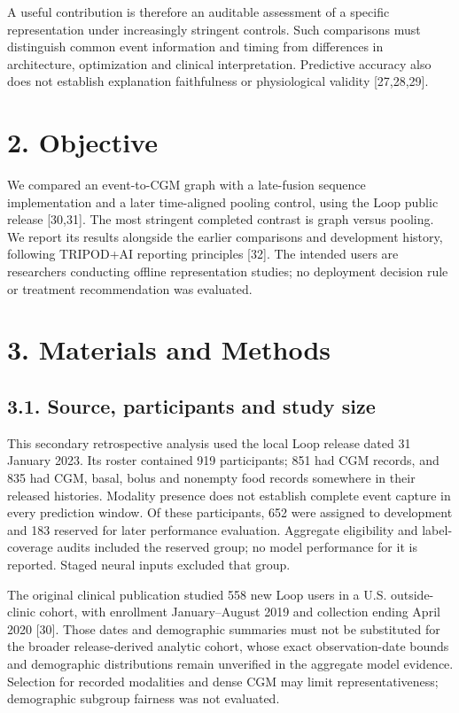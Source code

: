\documentclass[11pt,a4paper]{article}
\begin{document}
A useful contribution is therefore an auditable assessment of a specific representation under increasingly stringent controls. Such comparisons must distinguish common event information and timing from differences in architecture, optimization and clinical interpretation. Predictive accuracy also does not establish explanation faithfulness or physiological validity [27,28,29].

\section*{2. Objective}
We compared an event-to-CGM graph with a late-fusion sequence implementation and a later time-aligned pooling control, using the Loop public release [30,31]. The most stringent completed contrast is graph versus pooling. We report its results alongside the earlier comparisons and development history, following TRIPOD+AI reporting principles [32]. The intended users are researchers conducting offline representation studies; no deployment decision rule or treatment recommendation was evaluated.

\section*{3. Materials and Methods}
\subsection*{3.1. Source, participants and study size}
This secondary retrospective analysis used the local Loop release dated 31 January 2023. Its roster contained 919 participants; 851 had CGM records, and 835 had CGM, basal, bolus and nonempty food records somewhere in their released histories. Modality presence does not establish complete event capture in every prediction window. Of these participants, 652 were assigned to development and 183 reserved for later performance evaluation. Aggregate eligibility and label-coverage audits included the reserved group; no model performance for it is reported. Staged neural inputs excluded that group.

The original clinical publication studied 558 new Loop users in a U.S. outside-clinic cohort, with enrollment January--August 2019 and collection ending April 2020 [30]. Those dates and demographic summaries must not be substituted for the broader release-derived analytic cohort, whose exact observation-date bounds and demographic distributions remain unverified in the aggregate model evidence. Selection for recorded modalities and dense CGM may limit representativeness; demographic subgroup fairness was not evaluated.
\end{document}
